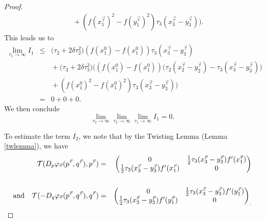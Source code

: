 \documentclass[reqno]{amsart}
\begin{document}
\begin{proof}
\begin{eqnarray*}
  & &\mbox{}+(f(x_1^{\vec{\tau}})^2-f(y_1^{\vec{\tau}})^2)\tau_3(x^{\vec{\tau}}_3-y^{\vec{\tau}}_3)\Bigg).
\end{eqnarray*}
This leads us to 
\begin{eqnarray*}
\lim_{\tau_1 \to \infty}I_1 & \le & \big(\tau_2+2\delta\tau_2^2\big)(f(x_1^0)-f(x_1^0))\tau_3(x^{\vec{\tau}}_3-y^{\vec{\tau}}_3) \\
 & & \mbox{}+\big(\tau_3+2\delta\tau_3^2\big)\Bigg((f(x^0_1)-f(x_1^0))\big(\tau_2(x^{\vec{\tau}}_2-y^{\vec{\tau}}_2)-\tau_3(x^{\vec{\tau}}_3-y^{\vec{\tau}}_3)\big) \\
  & &\mbox{}+(f(x_1^0)^2-f(x_1^0)^2)\tau_3(x^{\vec{\tau}}_3-y^{\vec{\tau}}_3)\Bigg)\\
  & = & 0+0+0.
\end{eqnarray*}
We then conclude
\begin{equation*}
\lim_{\tau_3 \to \infty} \lim_{\tau_2 \to \infty}\lim_{\tau_1 \to \infty} I_1 = 0.
\end{equation*}

To estimate the term $I_2$, we note that by the Twisting Lemma (Lemma \ref{twlemma}), we have
\begin{eqnarray*}
\mathcal{T}(D_p \varphi_{\vec{\tau}}(p^{\vec{\tau}}, q^{\vec{\tau}}), p^{\vec{\tau}}) & = &
\begin{pmatrix}
0 & \frac{1}{2}\tau_3(x^{\vec{\tau}}_3-y^{\vec{\tau}}_3)f'(x^{\vec{\tau}}_1) \\
 \frac{1}{2}\tau_3(x^{\vec{\tau}}_3-y^{\vec{\tau}}_3)f'(x^{\vec{\tau}}_1) & 0 
\end{pmatrix} \\
\mbox{} \\
\textmd{and \ \ }
\mathcal{T}(-D_q \varphi_{\vec{\tau}}(p^{\vec{\tau}}, q^{\vec{\tau}}), q^{\vec{\tau}}) & = &
\begin{pmatrix}
0 & \frac{1}{2}\tau_3(x^{\vec{\tau}}_3-y^{\vec{\tau}}_3)f'(y^{\vec{\tau}}_1) \\
 \frac{1}{2}\tau_3(x^{\vec{\tau}}_3-y^{\vec{\tau}}_3)f'(y^{\vec{\tau}}_1) & 0 
\end{pmatrix}_.
\end{eqnarray*}


\end{proof}
\end{document}

